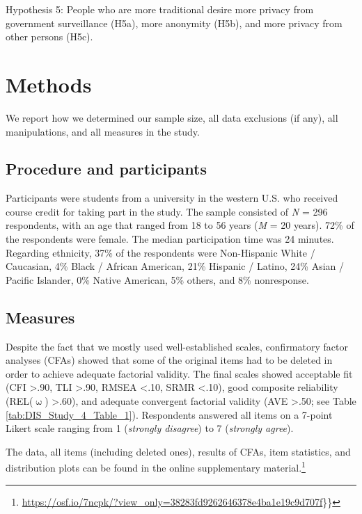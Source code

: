 \documentclass[man]{apa6}
\let\rmarkdownfootnote\footnote%
\def\footnote{\protect\rmarkdownfootnote}
\theoremstyle{definition}
\theoremstyle{definition}
\theoremstyle{definition}
\theoremstyle{remark}
\begin{document}
Hypothesis 5: People who are more traditional desire more privacy from
government surveillance (H5a), more anonymity (H5b), and more privacy
from other persons (H5c).

\hypertarget{methods}{%
\section{Methods}\label{methods}}

We report how we determined our sample size, all data exclusions (if
any), all manipulations, and all measures in the study.

\hypertarget{procedure-and-participants}{%
\subsection{Procedure and
participants}\label{procedure-and-participants}}

Participants were students from a university in the western U.S. who
received course credit for taking part in the study. The sample
consisted of \emph{N} = 296 respondents, with an age that ranged from 18
to 56 years (\emph{M} = 20 years). 72\% of the respondents were female.
The median participation time was 24 minutes. Regarding ethnicity, 37\%
of the respondents were Non-Hispanic White / Caucasian, 4\% Black /
African American, 21\% Hispanic / Latino, 24\% Asian / Pacific Islander,
0\% Native American, 5\% others, and 8\% nonresponse.

\hypertarget{measures}{%
\subsection{Measures}\label{measures}}

Despite the fact that we mostly used well-established scales,
confirmatory factor analyses (CFAs) showed that some of the original
items had to be deleted in order to achieve adequate factorial validity.
The final scales showed acceptable fit (CFI \textgreater .90, TLI
\textgreater .90, RMSEA \textless .10, SRMR \textless .10), good
composite reliability (REL(\(\upomega\)) \textgreater .60), and adequate
convergent factorial validity (AVE \textgreater .50; see Table
\ref{tab:DIS_Study_4_Table_1}). Respondents answered all items on a
7-point Likert scale ranging from 1 (\emph{strongly disagree}) to 7
(\emph{strongly agree}).

The data, all items (including deleted ones), results of CFAs, item
statistics, and distribution plots can be found in the online
supplementary material.\footnote{\url{https://osf.io/7ncpk/?view_only=38283fd9262646378e4ba1e19c9d707f}\}\}}
\end{document}

